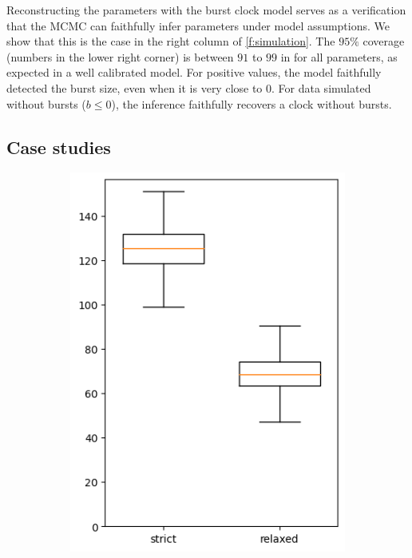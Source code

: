 \documentclass[]{rsos}%
\begin{document}
Reconstructing the parameters with the burst clock model serves as a
verification that the MCMC can faithfully infer parameters under model
assumptions. We show that this is the case in the right column of \cref{f:simulation}. The $95\%$ coverage (numbers in the lower right corner) is between  $91$ to $99$ in for all parameters, as expected in a well calibrated model. For positive values, the model faithfully detected the burst size, even when it is very close to $0$.
For data simulated without bursts ($b\leq 0$), the inference faithfully recovers
a clock without bursts.

\subsection{Case studies}

\begin{figure}
  \centering
  \begin{subfigure}{0.4\textwidth}
    \includegraphics[width=\textwidth]{supplement/analysis/austronesian_years_per_split.png}

\end{subfigure}
\end{figure}
\end{document}
